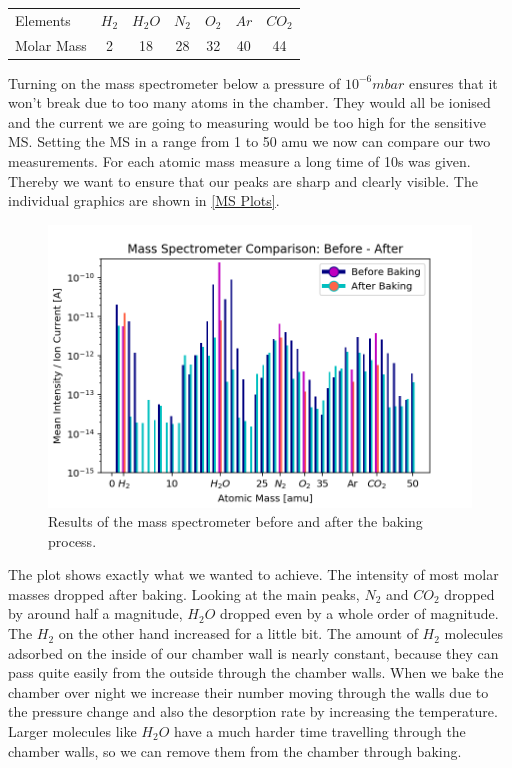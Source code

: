 \documentclass[]{article}
\begin{document}
\begin{table}[h]
\centering
\begin{tabular}{lcccccc}
Elements & $H_2$ & $H_2O$ & $N_2$ & $O_2$ & $Ar$ & $CO_2$ \\
Molar Mass & 2 & 18 & 28 & 32 & 40 & 44 \\
\end{tabular} 
\end{table}

Turning on the mass spectrometer below a pressure of $10^{-6} mbar$ ensures that it won't break due to too many atoms in the chamber. They would all be ionised and the current we are going to measuring would be too high for the sensitive MS. Setting the MS in a range from 1 to 50 amu we now can compare our two measurements. For each atomic mass measure a long time of 10s was given. Thereby we want to ensure that our peaks are sharp and clearly visible. The individual graphics are shown in \ref{MS Plots}.

\begin{figure}[h]
\centering\includegraphics[width=.8\textwidth]{Plots/BeforeAfter.png}
\caption{Results of the mass spectrometer before and after the baking process.}
\label{fig::BeforeAfter}
\end{figure}

The plot shows exactly what we wanted to achieve. The intensity of most molar masses dropped after baking. Looking at the main peaks, $N_2$ and $CO_2$ dropped by around half a magnitude,  $H_2O$ dropped even by a whole order of magnitude. The $H_2$ on the other hand increased for a little bit. The amount of $H_2$ molecules adsorbed on the inside of our chamber wall is nearly constant, because they can pass quite easily from the outside through the chamber walls. When we bake the chamber over night we increase their number moving through the walls due to the pressure change and also the desorption rate by increasing the temperature. Larger molecules like $H_{2}O$ have a much harder time travelling through the chamber walls, so we can remove them from the chamber through baking. 
\end{document}
